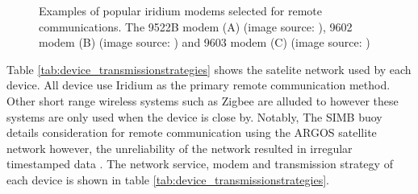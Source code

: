\begin{figure}[H]
	\centering
	\begin{subfigure}[b]{0.3\textwidth}
	\end{subfigure}%
	\hfill
	\begin{subfigure}[b]{0.3\textwidth}
	\end{subfigure}%
	\hfill
	\begin{subfigure}[b]{0.3\textwidth}
	\end{subfigure}%
	\hfill
	\caption{Examples of popular iridium modems selected for remote communications. The 9522B modem (A) (image source: \cite{9522B}), 9602 modem (B) (image source: \cite{9602}) and 9603 modem (C) (image source: \cite{9603})} 
	\label{fig:irid_modem}
\end{figure}

Table \ref{tab:device_transmissionstrategies} shows the satelite network used by each device. All device use Iridium as the primary remote communication method. Other short range wireless systems such as Zigbee \cite{guimaraes2018surface} are alluded to however these systems are only used when the device is close by. Notably, The SIMB buoy details consideration for remote communication using the ARGOS satellite network however, the unreliability of the network resulted in irregular timestamped data \cite{planck2019evolution}. The network service, modem and transmission strategy of each device is shown in table \ref{tab:device_transmissionstrategies}.


